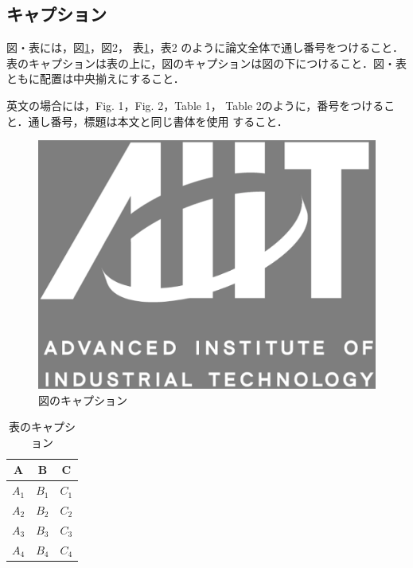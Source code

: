 \documentclass[a4j,9pt,twoside,twocolumn]{jsarticle}
\begin{document}
\subsection{キャプション}
図・表には，図\ref{fig:VFS}，図2，
表\ref{tab:cost2}，表2 のように論文全体で通し番号をつけること．
表のキャプションは表の上に，図のキャプションは図の下につけること．図・表
ともに配置は中央揃えにすること．

英文の場合には，Fig. 1，Fig. 2，Table 1，
Table 2のように，番号をつけること．通し番号，標題は本文と同じ書体を使用
すること．

\begin{figure}[h]
\centering
\includegraphics[width=20zw]{aiit_logo.eps}
\caption{図のキャプション}
\label{fig:VFS}
\end{figure}
\begin{table}[h]
\caption{表のキャプション}
\label{tab:cost2}
\centering
\begin{tabular}{|c|c|c|} \hline
A & B & C \\ \hline
$A_{1}$ & $B_{1}$ & $C_{1}$ \\ \hline
$A_{2}$ & $B_{2}$ & $C_{2}$ \\ \hline
$A_{3}$ & $B_{3}$ & $C_{3}$ \\ \hline
$A_{4}$ & $B_{4}$ & $C_{4}$ \\ \hline
\end{tabular}
\end{table}
\end{document}
